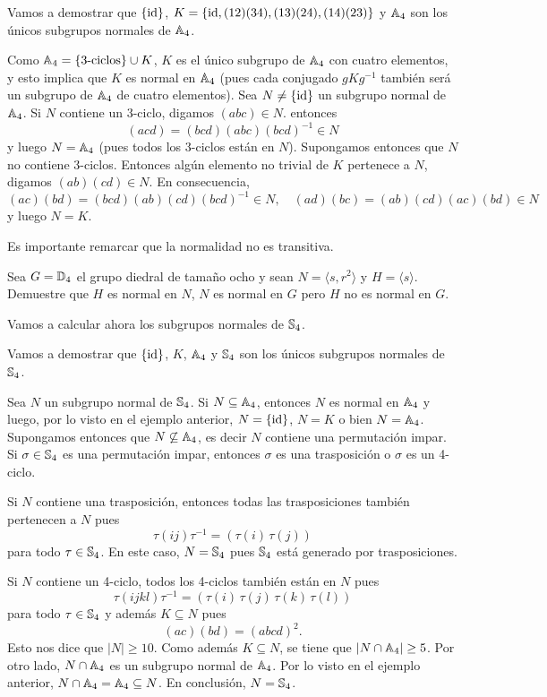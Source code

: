 \begin{example}
Vamos a demostrar que 
$\{\operatorname{id}\}$, $K=\{\operatorname{id},(12)(34),(13)(24),(14)(23)\}$ y $\mathbb{A}_4$ son los únicos subgrupos normales de $\mathbb{A}_4$. 
 	
Como $\mathbb{A}_4=\{\text{3-ciclos}\}\cup K$, $K$ es el único subgrupo de $\mathbb{A}_4$ con cuatro elementos, y esto implica que $K$ es normal en $\mathbb{A}_4$ (pues cada conjugado $gKg^{-1}$ también será un subgrupo de $\mathbb{A}_4$ de cuatro elementos). Sea $N\ne\{\operatorname{id}\}$ un subgrupo normal de $\mathbb{A}_4$. Si $N$ contiene un 3-ciclo, digamos
$(abc)\in N$. entonces
\[
(acd)=(bcd)(abc)(bcd)^{-1}\in N
\]
y luego $N=\mathbb{A}_4$ (pues todos los 3-ciclos están en $N$). Supongamos entonces que $N$ no contiene 3-ciclos. Entonces algún elemento no trivial de $K$ 
pertenece a $N$, digamos $(ab)(cd)\in N$. En consecuencia, 
\[
(ac)(bd)=(bcd)(ab)(cd)(bcd)^{-1}\in N,\quad
(ad)(bc)=(ab)(cd)(ac)(bd)\in N
\]
y luego $N=K$. 
\end{example}
 
Es importante remarcar que la normalidad no es transitiva.

\begin{exercise}
Sea $G=\mathbb{D}_4$ el grupo diedral de tamaño ocho y sean $N=\langle s,r^2\rangle$ y $H=\langle s\rangle$. Demuestre que 
$H$ es normal en $N$, $N$ es normal en $G$ pero $H$ no es normal en $G$.    
\end{exercise} 
 
Vamos a calcular ahora los subgrupos normales de $\mathbb{S}_4$. 
  
\begin{example}
Vamos a demostrar que $\{\operatorname{id}\}$, $K$, $\mathbb{A}_4$ y $\mathbb{S}_4$ son los únicos subgrupos normales de $\mathbb{S}_4$.

Sea $N$ un subgrupo normal de $\mathbb{S}_4$. Si $N\subseteq\mathbb{A}_4$, entonces $N$ es normal en $\mathbb{A}_4$ y luego, por lo visto en el ejemplo anterior, $N=\{\operatorname{id}\}$, 
$N=K$ o bien $N=\mathbb{A}_4$. Supongamos entonces que $N\not\subseteq\mathbb{A}_4$, es decir $N$ contiene una permutación impar. Si $\sigma\in\mathbb{S}_4$ es una permutación impar, entonces $\sigma$ es una trasposición o $\sigma$ es un 4-ciclo. 

Si $N$ contiene una trasposición, entonces todas las trasposiciones
también pertenecen a $N$ pues
\[
\tau(ij)\tau^{-1}=(\tau(i)\,\tau(j))
\]
para todo $\tau\in\mathbb{S}_4$. En este caso, $N=\mathbb{S}_4$ pues $\mathbb{S}_4$ está generado por trasposiciones.   

Si $N$ contiene un 4-ciclo, todos los 4-ciclos también están en $N$ pues
\[
\tau(ijkl)\tau^{-1}=(\tau(i)\,\tau(j)\,\tau(k)\,\tau(l))
\]
para todo $\tau\in\mathbb{S}_4$ y además $K\subseteq N$ pues
\[
(ac)(bd)=(abcd)^2.
\]
Esto nos dice que $|N|\geq10$. Como además $K\subseteq N$, se tiene que $|N\cap\mathbb{A}_4|\geq 5$. Por otro lado, $N\cap\mathbb{A}_4$ es un subgrupo normal de $\mathbb{A}_4$. 
Por lo visto en el ejemplo anterior, $N\cap\mathbb{A}_4=\mathbb{A}_4\subseteq N$. En conclusión, $N=\mathbb{S}_4$.   
\end{example}

